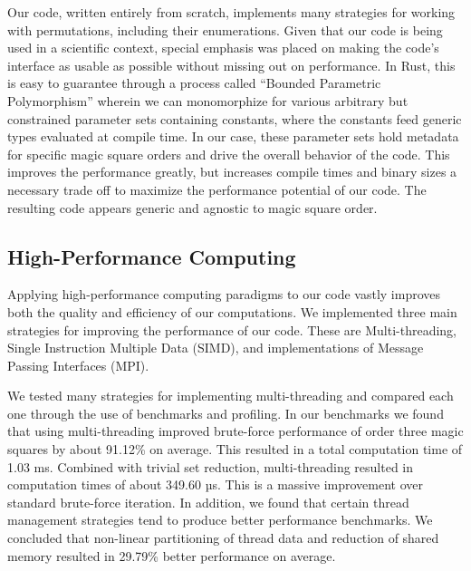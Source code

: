 \documentclass{rhumj_new}
\begin{document}
Our code, written entirely from scratch, implements many strategies for working with
permutations, including their enumerations. Given that our code is being used in a scientific
context, special emphasis was placed on making the code's interface as usable as possible without
missing out on performance. In Rust, this is easy to guarantee through a process called ``Bounded
Parametric Polymorphism'' wherein we can monomorphize for various arbitrary but constrained
parameter sets containing constants, where the constants feed generic types evaluated at compile
time\cite{Cardelli}. In our case, these parameter sets hold metadata for specific magic square
orders and
drive the overall behavior of the code. This improves the performance greatly, but increases
compile times and binary sizes \textemdash{} a necessary trade off to maximize the performance
potential
of our code. The resulting code appears generic and agnostic to magic square order.

\subsection{High-Performance Computing}

Applying high-performance computing paradigms to our code vastly improves both the quality and
efficiency of our computations. We implemented three main strategies for improving the performance
of our code. These are Multi-threading, Single Instruction Multiple Data (SIMD), and
implementations of Message Passing Interfaces (MPI).

We tested many strategies for implementing multi-threading and compared each one through the
use of benchmarks and profiling. In our benchmarks we found that using multi-threading improved
brute-force performance of order three magic squares by about 91.12\% on average. This resulted in
a total computation time of 1.03 ms. Combined with trivial set reduction, multi-threading resulted
in computation times of about 349.60 µs. This is a massive improvement over standard brute-force
iteration. In addition, we found that certain thread management strategies tend to produce better
performance benchmarks. We concluded that non-linear partitioning of thread data and reduction of
shared memory resulted in 29.79\% better performance on average.
\end{document}
